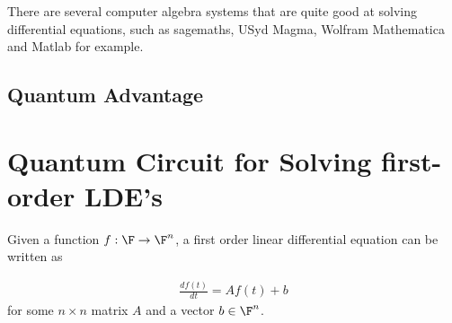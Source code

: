\documentclass[11pt]{article}
\begin{document}
There are several computer algebra systems that are quite good at solving differential equations, such as sagemaths, USyd Magma, Wolfram Mathematica and Matlab for example.
\subsection{Quantum Advantage}
\label{sec:orgebf6c43}
\section{Quantum Circuit for Solving first-order LDE's}
\label{sec:org97aa52d}

Given a function \(f : \F \to \F^{n}\), a first order linear differential equation can be written as

\begin{align}
\frac{df(t)}{dt} = Af(t) + b
\end{align}
for some \(n\times n\) matrix \(A\) and a vector \(b\in \F^{n}\).
\end{document}
